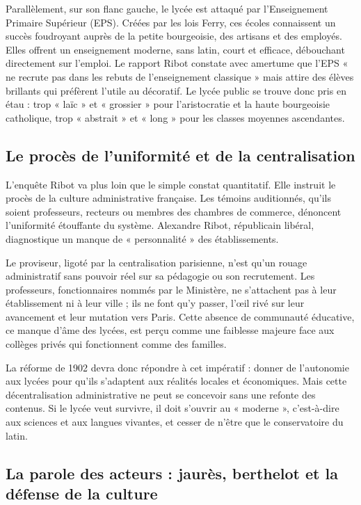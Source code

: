 Parallèlement, sur son flanc gauche, le lycée est attaqué par l'Enseignement Primaire Supérieur
(EPS). Créées par les lois Ferry, ces écoles connaissent un succès foudroyant auprès de la petite
bourgeoisie, des artisans et des employés. Elles offrent un enseignement moderne, sans latin, court
et efficace, débouchant directement sur l'emploi. Le rapport Ribot constate avec amertume que l'EPS
« ne recrute pas dans les rebuts de l'enseignement classique » mais attire des élèves brillants qui
préfèrent l'utile au décoratif.\cite{I-2-1-ref2} Le lycée public se trouve donc pris en étau : trop
« laïc » et « grossier » pour l'aristocratie et la haute bourgeoisie catholique, trop « abstrait »
et « long » pour les classes moyennes ascendantes.



\subsection{Le procès de l'uniformité et de la centralisation}

L'enquête Ribot va plus loin que le simple constat quantitatif. Elle instruit le procès de la
culture administrative française. Les témoins auditionnés, qu'ils soient professeurs, recteurs ou
membres des chambres de commerce, dénoncent l'uniformité étouffante du système. Alexandre Ribot,
républicain libéral, diagnostique un manque de « personnalité » des établissements.\cite{I-2-1-ref1}

Le proviseur, ligoté par la centralisation parisienne, n'est qu'un rouage administratif sans pouvoir
réel sur sa pédagogie ou son recrutement. Les professeurs, fonctionnaires nommés par le Ministère,
ne s'attachent pas à leur établissement ni à leur ville ; ils ne font qu'y passer, l'œil rivé sur
leur avancement et leur mutation vers Paris.\cite{I-2-1-ref1} Cette absence de communauté éducative,
ce manque d'âme des lycées, est perçu comme une faiblesse majeure face aux collèges privés qui
fonctionnent comme des familles.

La réforme de 1902 devra donc répondre à cet impératif : donner de l'autonomie aux lycées pour
qu'ils s'adaptent aux réalités locales et économiques.\cite{I-2-1-ref1} Mais cette décentralisation
administrative ne peut se concevoir sans une refonte des contenus. Si le lycée veut survivre, il
doit s'ouvrir au « moderne », c'est-à-dire aux sciences et aux langues vivantes, et cesser de n'être
que le conservatoire du latin.



\subsection{La parole des acteurs : jaurès, berthelot et la défense de la culture}

